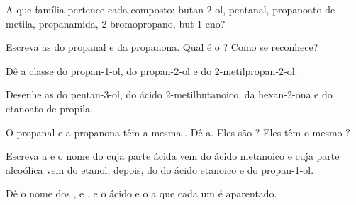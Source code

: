 \begin{exercise}[$\star$]\label{exo:g11:functional-groups:3}
A que família pertence cada composto: butan-2-ol, pentanal, propanoato
de metila, propanamida, 2-bromopropano, but-1-eno?
\end{exercise}

\begin{exercise}[$\star$]\label{exo:g11:functional-groups:4}
Escreva as  do propanal e da propanona.
Qual é o ? Como se reconhece?
\end{exercise}

\begin{exercise}[$\star$]\label{exo:g11:functional-groups:5}
Dê a classe do propan-1-ol, do propan-2-ol e do 2-metilpropan-2-ol.
\end{exercise}

\begin{exercise}[$\star\star$]\label{exo:g11:functional-groups:6}
Desenhe as  do pentan-3-ol, do ácido
2-metilbutanoico, da hexan-2-ona e do etanoato de propila.
\end{exercise}

\begin{exercise}[$\star\star$]\label{exo:g11:functional-groups:7}
O propanal e a propanona têm a mesma . Dê-a. Eles são
? Eles têm o mesmo ?
\end{exercise}

\begin{exercise}[$\star\star$]\label{exo:g11:functional-groups:8}
Escreva a  e o nome do  cuja parte
ácida vem do ácido metanoico  e cuja parte alcoólica vem do
etanol; depois, do  do ácido etanoico e do propan-1-ol.
\end{exercise}

\begin{exercise}[$\star\star$]\label{exo:g11:functional-groups:9}
Dê o nome dos  ,  e
, e o ácido e o  a que cada um é aparentado.
\end{exercise}

